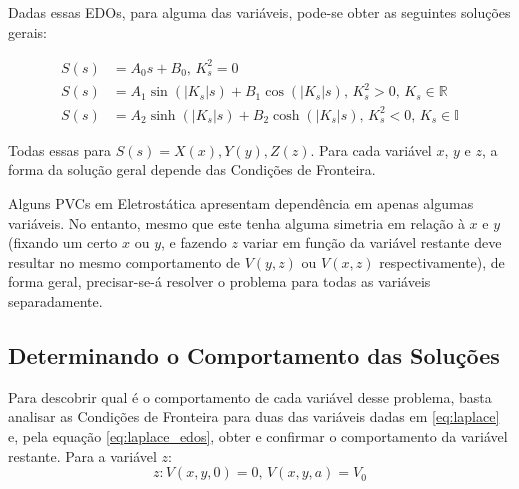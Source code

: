\documentclass{report}
\begin{document}
Dadas essas EDOs, para alguma das variáveis, pode-se obter as seguintes soluções gerais:

\vspace*{-1.5\baselineskip}
\begin{center}
  \begin{align}
    \label{eq:laplace_solutions_degenerates}
    S(s) &= A_0s + B_0,\, K_s^2 = 0 \\
    \label{eq:laplace_solutions_real}
    S(s) &= A_1\sin(|K_s|s) + B_1\cos(|K_s|s),\, K_s^2 > 0,\, K_s \in \mathbb{R} \\
    \label{eq:laplace_solutions_imaginary}
    S(s) &= A_2\sinh(|K_s|s) + B_2\cosh(|K_s|s),\, K_s^2 < 0,\, K_s \in \mathbb{I}
  \end{align}
\end{center}

Todas essas para $ S(s) = X(x), Y(y), Z(z) $. Para cada variável $ x $, $ y $ e $ z $, a
forma da solução geral depende das Condições de Fronteira.

Alguns PVCs em Eletrostática apresentam dependência em apenas algumas variáveis. No entanto,
mesmo que este tenha alguma simetria em relação à $ x $ e $ y $ (fixando um certo $ x $ ou $ y $,
e fazendo $ z $ variar em função da variável restante deve resultar no mesmo comportamento de $ V(y,z) $
ou $ V(x,z) $ respectivamente), de forma geral, precisar-se-á resolver o problema para todas as variáveis separadamente.

\subsection{Determinando o Comportamento das Soluções}

Para descobrir qual é o comportamento de cada variável desse problema, basta analisar as Condições de Fronteira
para duas das variáveis dadas em \ref{eq:laplace} e, pela equação \ref{eq:laplace_edos}, obter e confirmar o
comportamento da variável restante.
Para a variável $ z $:
$$ z: V(x, y, 0) = 0,\, V(x, y, a) = V_0 $$
\end{document}
